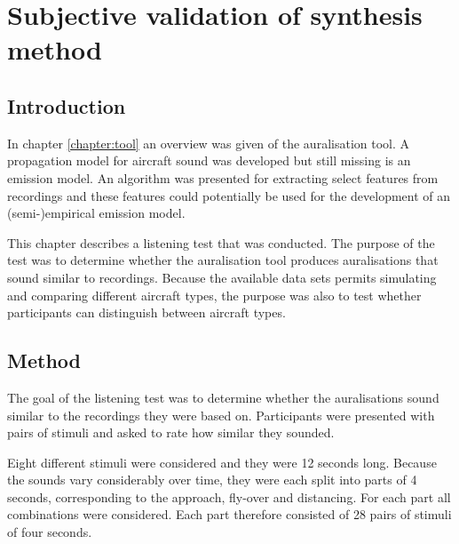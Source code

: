 \chapter{Subjective validation of synthesis method}\label{chapter:test}

\section{Introduction}
In chapter \ref{chapter:tool} an overview was given of the auralisation tool. A
propagation model for aircraft sound was developed but still missing is an
emission model. An algorithm was presented for extracting select features from
recordings and these features could potentially be used for the development of
an (semi-)empirical emission model.

This chapter describes a listening test that was conducted. The purpose of the
test was to determine whether the auralisation tool produces auralisations that
sound similar to recordings. Because the available data sets permits simulating
and comparing different aircraft types, the purpose was also to test whether
participants can distinguish between aircraft types.


\section{Method}

The goal of the listening test was to determine whether the auralisations sound
similar to the recordings they were based on. Participants were presented with
pairs of stimuli and asked to rate how similar they sounded.


Eight different stimuli were considered and they were 12 seconds long.
Because the sounds vary considerably over time, they were each split into parts
of 4 seconds, corresponding to the approach, fly-over and distancing. For each
part all combinations were considered. Each part therefore consisted of 28 pairs
of stimuli of four seconds.


